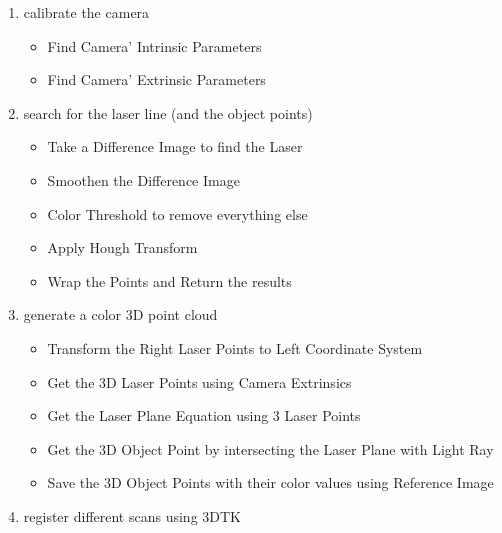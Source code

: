 \begin{enumerate}
	\item calibrate the camera
		\begin{itemize}
			\item Find Camera' Intrinsic Parameters
	    \item Find Camera' Extrinsic Parameters
		\end{itemize}
	\item search for the laser line (and the object points)	
		\begin{itemize}
			\item Take a Difference Image to find the Laser
	    \item Smoothen the Difference Image
	    \item Color Threshold to remove everything else
	    \item Apply Hough Transform
	    \item Wrap the Points and Return the results
		\end{itemize}	
	\item generate a color 3D point cloud	
		\begin{itemize}
			\item Transform the Right Laser Points to Left Coordinate System
	    \item Get the 3D Laser Points using Camera Extrinsics
	    \item Get the Laser Plane Equation using 3 Laser Points
	    \item Get the 3D Object Point by intersecting the
	 					Laser Plane with Light Ray
	    \item Save the 3D Object Points with their color values 
						using Reference Image
		\end{itemize}	
	\item register different scans using 3DTK
\end{enumerate}

